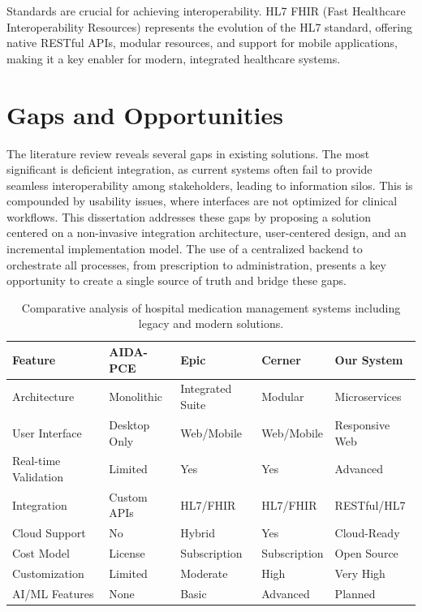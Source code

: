Standards are crucial for achieving interoperability. HL7 FHIR (Fast Healthcare Interoperability Resources) represents the evolution of the HL7 standard, offering native RESTful APIs, modular resources, and support for mobile applications, making it a key enabler for modern, integrated healthcare systems.

\section{Gaps and Opportunities}

The literature review reveals several gaps in existing solutions. The most significant is deficient integration, as current systems often fail to provide seamless interoperability among stakeholders, leading to information silos. This is compounded by usability issues, where interfaces are not optimized for clinical workflows. This dissertation addresses these gaps by proposing a solution centered on a non-invasive integration architecture, user-centered design, and an incremental implementation model. The use of a centralized backend to orchestrate all processes, from prescription to administration, presents a key opportunity to create a single source of truth and bridge these gaps.

\begin{table}[H]
    \centering
    \caption{Comparative analysis of hospital medication management systems including legacy and modern solutions.}
    \label{tab:comparison}
    \begin{tabularx}{\textwidth}{@{}l|X|X|X|X@{}}
        \toprule
        \textbf{Feature} & \textbf{AIDA-PCE} & \textbf{Epic} & \textbf{Cerner} & \textbf{Our System} \\
        \midrule
        Architecture & Monolithic & Integrated Suite & Modular & Microservices \\
        User Interface & Desktop Only & Web/Mobile & Web/Mobile & Responsive Web \\
        Real-time Validation & Limited & Yes & Yes & Advanced \\
        Integration & Custom APIs & HL7/FHIR & HL7/FHIR & RESTful/HL7 \\
        Cloud Support & No & Hybrid & Yes & Cloud-Ready \\
        Cost Model & License & Subscription & Subscription & Open Source \\
        Customization & Limited & Moderate & High & Very High \\
        AI/ML Features & None & Basic & Advanced & Planned \\
        \bottomrule
    \end{tabularx}
\end{table}

